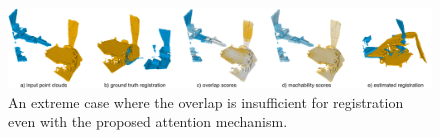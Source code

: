 \begin{figure}[t!]
    \centering
    \includegraphics[width=1\textwidth]{figures/images/one_row.jpg}
    \caption{An extreme case where the overlap is insufficient for registration even with the proposed attention mechanism.}
    \label{fig:failure_image}
\end{figure}